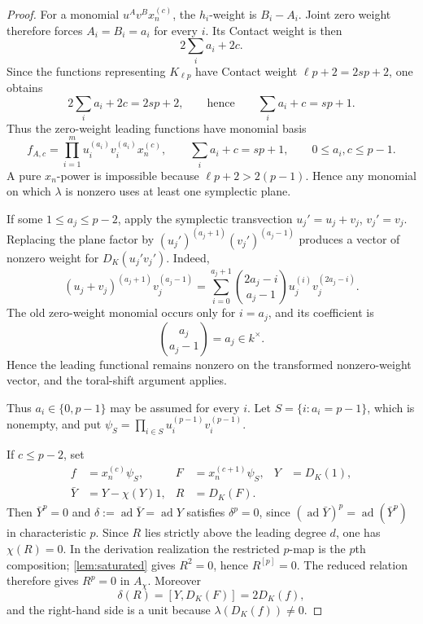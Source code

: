 \documentclass[11pt,reqno]{amsart}
\theoremstyle{definition}
\theoremstyle{remark}
\theoremstyle{definition}
\newcommand{\Achi}{A_{\chi}}
\newcommand{\ad}{\operatorname{ad}}
\begin{document}
\begin{proof}
For a monomial $u^Av^Bx_n^{(c)}$, the $h_i$-weight is
$B_i-A_i$.  Joint zero weight therefore forces $A_i=B_i=a_i$ for every
$i$.  Its Contact weight is then
\[
 2\sum_i a_i+2c.
\]
Since the functions representing $K_{\ell p}$ have Contact weight
$\ell p+2=2sp+2$, one obtains
\[
 2\sum_i a_i+2c=2sp+2,
 \qquad\text{hence}\qquad
 \sum_i a_i+c=sp+1.
\]
Thus the zero-weight leading functions have monomial basis
\[
 f_{A,c}=\prod_{i=1}^m u_i^{(a_i)}v_i^{(a_i)}x_n^{(c)},
 \qquad
 \sum_i a_i+c=sp+1,
 \qquad 0\le a_i,c\le p-1.
\]
A pure $x_n$-power is impossible because $\ell p+2>2(p-1)$.  Hence any
monomial on which $\lambda$ is nonzero uses at least one symplectic plane.

If some $1\le a_j\le p-2$, apply the symplectic transvection
$u_j'=u_j+v_j$, $v_j'=v_j$.  Replacing the plane factor by
$(u_j')^{(a_j+1)}(v_j')^{(a_j-1)}$ produces a vector of nonzero weight for
$D_K(u_j'v_j')$.  Indeed,
\[
 (u_j+v_j)^{(a_j+1)}v_j^{(a_j-1)}
 =\sum_{i=0}^{a_j+1}
 \binom{2a_j-i}{a_j-1}u_j^{(i)}v_j^{(2a_j-i)}.
\]
The old zero-weight monomial occurs only for $i=a_j$, and its coefficient is
\[
 \binom{a_j}{a_j-1}=a_j\in k^\times.
\]
Hence the leading functional remains nonzero on the transformed
nonzero-weight vector, and the toral-shift argument applies.

Thus $a_i\in\{0,p-1\}$ may be assumed for every $i$.  Let
$S=\{i:a_i=p-1\}$, which is nonempty, and put
$\psi_S=\prod_{i\in S}u_i^{(p-1)}v_i^{(p-1)}$.

If $c\le p-2$, set
\begin{align*}
 f&=x_n^{(c)}\psi_S,
 &F&=x_n^{(c+1)}\psi_S,
 &Y&=D_K(1),\\
 \bar Y&=Y-\chi(Y)1,
 &R&=D_K(F).
\end{align*}
Then $\bar Y^p=0$ and $\delta:=\ad\bar Y=\ad Y$ satisfies
$\delta^p=0$, since $(\ad\bar Y)^p=\ad(\bar Y^p)$ in characteristic
$p$.  Since $R$ lies strictly above the leading degree $d$, one has
$\chi(R)=0$.  In the derivation realization the restricted $p$-map is the
$p$th composition; \cref{lem:saturated} gives $R^2=0$, hence
$R^{[p]}=0$.  The reduced relation therefore gives $R^p=0$ in $\Achi$.  Moreover
\[
 \delta(R)=[Y,D_K(F)]=2D_K(f),
\]
and the right-hand side is a unit because $\lambda(D_K(f))\ne0$.


\end{proof}
\end{document}
